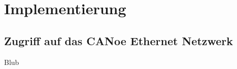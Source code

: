 \chapter{Implementierung}\label{sec:implementierung}



\section{Zugriff auf das CANoe Ethernet Netzwerk}\label{sec:canoetcpip}
Blub